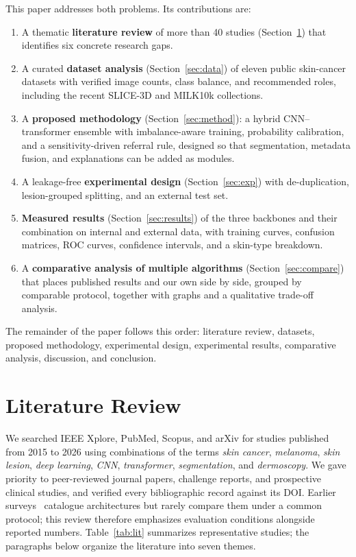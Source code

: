 This paper addresses both problems. Its contributions are:
\begin{enumerate}
  \item A thematic \textbf{literature review} of more than 40 studies
        (Section~\ref{sec:lit}) that identifies six concrete research
        gaps.
  \item A curated \textbf{dataset analysis} (Section~\ref{sec:data})
        of eleven public skin-cancer datasets with verified image
        counts, class balance, and recommended roles, including the
        recent SLICE-3D and MILK10k collections.
  \item A \textbf{proposed methodology} (Section~\ref{sec:method}): a
        hybrid CNN--transformer ensemble with imbalance-aware training,
        probability calibration, and a sensitivity-driven referral
        rule, designed so that segmentation, metadata fusion, and
        explanations can be added as modules.
  \item A leakage-free \textbf{experimental design}
        (Section~\ref{sec:exp}) with de-duplication, lesion-grouped
        splitting, and an external test set.
  \item \textbf{Measured results} (Section~\ref{sec:results}) of the
        three backbones and their combination on internal and external
        data, with training curves, confusion matrices, ROC curves,
        confidence intervals, and a skin-type breakdown.
  \item A \textbf{comparative analysis of multiple algorithms}
        (Section~\ref{sec:compare}) that places published results and
        our own side by side, grouped by comparable protocol, together
        with graphs and a qualitative trade-off analysis.
\end{enumerate}

The remainder of the paper follows this order: literature review,
datasets, proposed methodology, experimental design, experimental
results, comparative analysis, discussion, and conclusion.

\section{Literature Review}\label{sec:lit}
We searched IEEE Xplore, PubMed, Scopus, and arXiv for studies published
from 2015 to 2026 using combinations of the terms \emph{skin cancer},
\emph{melanoma}, \emph{skin lesion}, \emph{deep learning}, \emph{CNN},
\emph{transformer}, \emph{segmentation}, and \emph{dermoscopy}. We gave
priority to peer-reviewed journal papers, challenge reports, and
prospective clinical studies, and verified every bibliographic record
against its DOI. Earlier surveys~\cite{naqvi2023,hermosilla2024,naseri2025}
catalogue architectures but rarely compare them under a common
protocol; this review therefore emphasizes evaluation conditions
alongside reported numbers. Table~\ref{tab:lit} summarizes
representative studies; the paragraphs below organize the literature
into seven themes.

